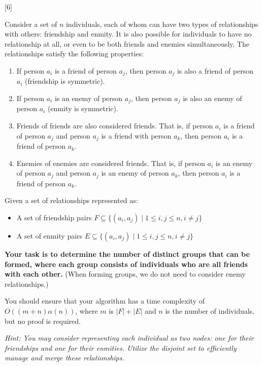 [6]
\raggedright
Consider a set of \( n \) individuals, each of whom can have two types of relationships with others: friendship and enmity. It is also possible for individuals to have no relationship at all, or even to be both friends and enemies simultaneously. The relationships satisfy the following properties:

\begin{enumerate}
    \item If person \( a_i \) is a friend of person \( a_j \), then person \( a_j \) is also a friend of person \( a_i \) (friendship is symmetric).
    \item If person \( a_i \) is an enemy of person \( a_j \), then person \( a_j \) is also an enemy of person \( a_i \) (enmity is symmetric).
    \item Friends of friends are also considered friends. That is, if person \( a_i \) is a friend of person \( a_j \) and person \( a_j \) is a friend with person \( a_k \), then person \( a_i \) is a friend of person \( a_k \).
    \item Enemies of enemies are considered friends. That is, if person \( a_i \) is an enemy of person \( a_j \) and person \( a_j \) is an enemy of person \( a_k \), then person \( a_i \) is a friend of person \( a_k \).
\end{enumerate}

Given a set of relationships represented as:

\begin{itemize}
    \item A set of friendship pairs \( F \subseteq \{(a_i, a_j) \mid 1 \leq i, j \leq n, i \neq j\} \)
    \item A set of enmity pairs \( E \subseteq \{(a_i, a_j) \mid 1 \leq i, j \leq n, i \neq j\} \)
\end{itemize}

\textbf{Your task is to determine the number of distinct groups that can be formed, where each group consists of individuals who are all friends with each other.} (When forming groups, we do not need to consider enemy relationships.)

You should ensure that your algorithm has a time complexity of $O((m+n)\alpha(n))$, where $m$ is $|F|+|E|$ and $n$ is the number of individuals, but no proof is required.

\textit{Hint: You may consider representing each individual as two nodes: one for their friendships and one for their enmities. Utilize the disjoint set to efficiently manage and merge these relationships.}

